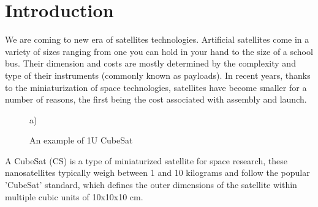 \chapter{Introduction}




We are coming to new era of satellites technologies.
Artificial satellites come in a variety of sizes ranging from one you can hold in your hand to the size of a school bus. Their dimension and costs are mostly determined by the complexity and type of their instruments (commonly known as payloads). In recent years, thanks to the miniaturization of space technologies, satellites have become smaller for a number of reasons, the first being the cost associated with assembly and launch. %


\begin{minipage}[h]{0.4\linewidth}
\begin{figure}[H]

 a) \\
\caption{An example of 1U CubeSat}
\label{fig:cubesat}
\end{figure}
\end{minipage}
\hfill
\begin{minipage}[h]{0.5\linewidth}

A CubeSat (CS) is a type of miniaturized satellite for space research, these nanosatellites typically weigh between 1 and 10 kilograms and follow the popular 'CubeSat' standard,
which defines the outer dimensions of the satellite within multiple cubic units of 10x10x10 cm.


\end{minipage}
\vspace{1cm}



